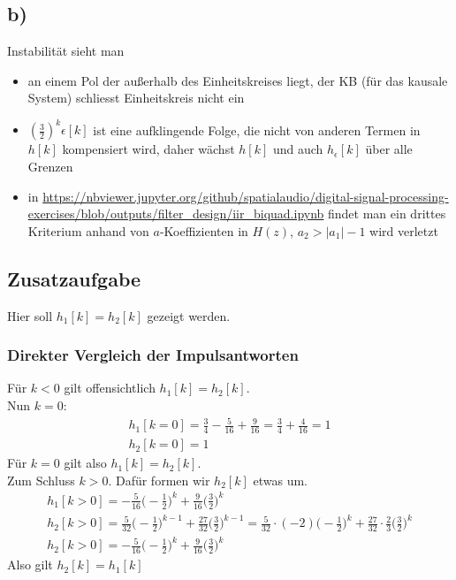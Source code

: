 \documentclass[11pt,a4paper,DIV=12]{scrartcl}
\begin{document}
\subsection*{b)}
%
Instabilität sieht man
%
\begin{itemize}
	\item an einem Pol der außerhalb des Einheitskreises liegt, der KB (für das kausale System) schliesst Einheitskreis nicht ein
	\item $\left(\frac{3}{2}\right)^k \epsilon[k]$ ist eine aufklingende Folge, die nicht von anderen Termen in $h[k]$ kompensiert wird, daher wächst $h[k]$ und auch $h_\epsilon[k]$ über alle Grenzen
	\item in \url{https://nbviewer.jupyter.org/github/spatialaudio/digital-signal-processing-exercises/blob/outputs/filter_design/iir_biquad.ipynb}
	findet man ein drittes Kriterium anhand von $a$-Koeffizienten in $H(z)$, $a_2>|a_1|-1$ wird verletzt
\end{itemize}
%
\newpage
\subsection*{Zusatzaufgabe}
%
Hier soll $h_1[k]=h_2[k]$ gezeigt werden.
%
\subsubsection*{Direkter Vergleich der Impulsantworten}
%
Für $k<0$ gilt offensichtlich $h_1[k]=h_2[k]$.\\
%
Nun $k=0$:
%
\begin{gather}
	h_1[k=0]=\frac{3}{4}-\frac{5}{16}+\frac{9}{16}=\frac{3}{4}+\frac{4}{16}=1\\
	h_2[k=0]=1
\end{gather}
%
%
Für $k=0$ gilt also $h_1[k]=h_2[k]$.\\
%
Zum Schluss $k>0$. Dafür formen wir $h_2[k]$ etwas um.
%
%
\begin{gather}
	h_1[k>0]=-\frac{5}{16}\bigg (-\frac{1}{2}\bigg )^k+\frac{9}{16}\bigg (\frac{3}{2}\bigg )^k\\
	h_2[k>0]=\frac{5}{32}\bigg (-\frac{1}{2}\bigg )^{k-1}+\frac{27}{32}\bigg (\frac{3}{2}\bigg )^{k-1}
	=\frac{5}{32}\cdot(-2)\bigg (-\frac{1}{2}\bigg )^k+\frac{27}{32}\cdot\frac{2}{3}\bigg (\frac{3}{2}\bigg )^k\\
	h_2[k>0]=-\frac{5}{16}\bigg (-\frac{1}{2}\bigg )^k+\frac{9}{16}\bigg (\frac{3}{2}\bigg )^k
\end{gather}
%
%
Also gilt $h_2[k]=h_1[k]$
%
\end{document}
